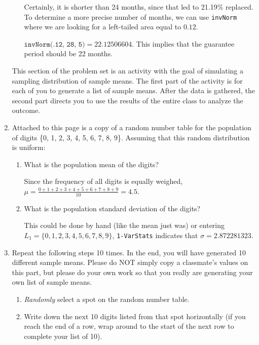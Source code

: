 \documentclass[11pt]{article}
\newcommand{\answer}[1]{\color{white}#1}
\begin{document}
\begin{enumerate}
\begin{enumerate}
	{\answer Certainly, it is shorter than 24 months, since that led to 21.19\% replaced.  To determine a more precise number of months, we can use \texttt{invNorm} where we are looking for a left-tailed area equal to $0.12$. 
	
	$\texttt{invNorm(.12, 28, 5)} = 22.12506604$.  This implies that the guarantee period should be 22 months.
	} 

	\end{enumerate}

This section of the problem set is an activity with the goal of simulating a sampling distribution of sample means. The first part of the activity is for each of you to generate a list of sample means. After the data is gathered, the second part directs you to use the results of the entire class to analyze the outcome.


\item Attached to this page is a copy of a random number table for the population of digits \{0, 1, 2, 3, 4, 5, 6, 7, 8, 9\}. Assuming that this random distribution is uniform:

	\begin{enumerate}
	
	\item What is the population mean of the digits? 
	
	{\answer Since the frequency of all digits is equally weighed, $\mu = \frac{0+1+2+3+4+5+6+7+8+9}{10} = 4.5$.
	}
	
	\item What is the population standard deviation of the digits? 
	
	{\answer This could be done by hand (like the mean just was) or entering $L_1=\{0, 1, 2, 3, 4, 5, 6, 7, 8, 9\}$, \texttt{1-VarStats} indicates that $\sigma = 2.872281323$.
	} 
	\end{enumerate}
	
\item Repeat the following steps 10 times. In the end, you will have generated 10 different sample means. Please do NOT simply copy a classmate's values on this part, but please do your own work so that you really are generating your own list of sample means. 

	\begin{enumerate}
	
	\item {\em Randomly} select a spot on the random number table.
	
	\item Write down the next 10 digits listed from that spot horizontally (if you reach the end of a row, wrap around to the start of the next row to complete your list of 10). 
	

\end{enumerate}
\end{enumerate}
\end{document}
